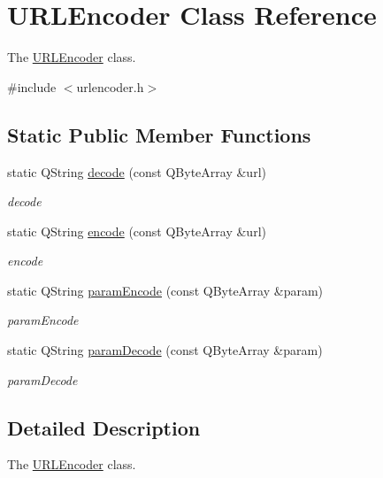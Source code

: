 \hypertarget{class_u_r_l_encoder}{}\section{U\+R\+L\+Encoder Class Reference}
\label{class_u_r_l_encoder}


The \hyperlink{class_u_r_l_encoder}{U\+R\+L\+Encoder} class.  




{\ttfamily \#include $<$urlencoder.\+h$>$}

\subsection*{Static Public Member Functions}
\begin{DoxyCompactItemize}
\item 
static Q\+String \hyperlink{class_u_r_l_encoder_a109e17d4d839a70b56125c239918b639}{decode} (const Q\+Byte\+Array \&url)
\begin{DoxyCompactList}\small\item\em decode \end{DoxyCompactList}\item 
static Q\+String \hyperlink{class_u_r_l_encoder_ad30f9c19d4629f268d54983d891db714}{encode} (const Q\+Byte\+Array \&url)
\begin{DoxyCompactList}\small\item\em encode \end{DoxyCompactList}\item 
static Q\+String \hyperlink{class_u_r_l_encoder_a1621d8a57c2fd83dabce790a8eeef976}{param\+Encode} (const Q\+Byte\+Array \&param)
\begin{DoxyCompactList}\small\item\em param\+Encode \end{DoxyCompactList}\item 
static Q\+String \hyperlink{class_u_r_l_encoder_a8780e1a9f6186726c83776a5c3543b6e}{param\+Decode} (const Q\+Byte\+Array \&param)
\begin{DoxyCompactList}\small\item\em param\+Decode \end{DoxyCompactList}\end{DoxyCompactItemize}


\subsection{Detailed Description}
The \hyperlink{class_u_r_l_encoder}{U\+R\+L\+Encoder} class. 

